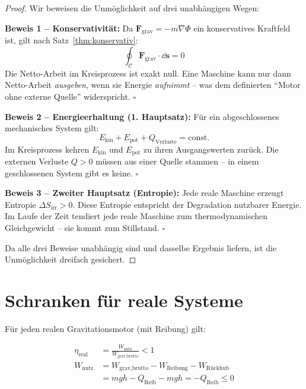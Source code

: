 ﻿\documentclass[12pt, a4paper]{report}
\theoremstyle{definition}
\theoremstyle{remark}
\newcommand{\vek}[1]{\boldsymbol{#1}}
\begin{document}
\begin{proof}
  Wir beweisen die Unmöglichkeit auf drei unabhängigen Wegen:

  \textbf{Beweis 1 -- Konservativität:}
  Da $\vek{F}_{\text{grav}} = -m\nabla\Phi$ ein konservatives Kraftfeld ist, gilt
  nach Satz~\ref{thm:konservativ}:
  \begin{equation}
    \oint_{\mathcal{C}} \vek{F}_{\text{grav}} \cdot \dd\vek{s} = 0
  \end{equation}
  Die Netto-Arbeit im Kreisprozess ist exakt null. Eine Maschine kann nur dann
  Netto-Arbeit \emph{ausgeben}, wenn sie Energie \emph{aufnimmt} -- was dem
  definierten ``Motor ohne externe Quelle'' widerspricht. $\square$

  \textbf{Beweis 2 -- Energieerhaltung (1. Hauptsatz):}
  Für ein abgeschlossenes mechanisches System gilt:
  \begin{equation}
    E_{\text{kin}} + E_{\text{pot}} + Q_{\text{Verluste}} = \text{const.}
  \end{equation}
  Im Kreisprozess kehren $E_{\text{kin}}$ und $E_{\text{pot}}$ zu ihren
  Ausgangswerten zurück. Die externen Verluste $Q > 0$ müssen aus einer
  Quelle stammen -- in einem geschlossenen System gibt es keine. $\square$

  \textbf{Beweis 3 -- Zweiter Hauptsatz (Entropie):}
  Jede reale Maschine erzeugt Entropie $\Delta S_{\text{irr}} > 0$. Diese
  Entropie entspricht der Degradation nutzbarer Energie. Im Laufe der Zeit
  tendiert jede reale Maschine zum thermodynamischen Gleichgewicht --
  sie kommt zum Stillstand. $\square$

  Da alle drei Beweise unabhängig sind und dasselbe Ergebnis liefern, ist
  die Unmöglichkeit dreifach gesichert.
\end{proof}

\section{Schranken für reale Systeme}

Für jeden realen Gravitationsmotor (mit Reibung) gilt:

\begin{align}
  \eta_{\text{real}} &= \frac{W_{\text{nutz}}}{W_{\text{grav,brutto}}} < 1 \label{eq:eta_real}\\
  W_{\text{nutz}} &= W_{\text{grav,brutto}} - W_{\text{Reibung}} - W_{\text{Rückhub}} \label{eq:nutzarbeit}\\
  &= mgh - Q_{\text{Reib}} - mgh = -Q_{\text{Reib}} \leq 0 \label{eq:nutzarbeit2}
\end{align}
\end{document}
